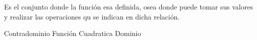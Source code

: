 
\question Es el conjunto donde la función esa definida, osea donde puede
tomar sus valores y realizar las operaciones qu se indican en  dicha
relación.


  \begin{oneparchoices}
    \choice Contradominio
    \choice Función
    \choice Cuadratica
    \choice Dominio
  \end{oneparchoices}
